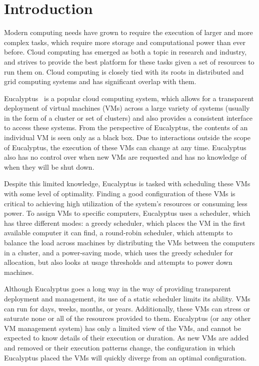\section{Introduction}
\label{sec:intro}

   Modern computing needs have grown to require the execution of larger and more complex tasks, which require more storage and computational power than ever before.  Cloud computing has emerged as both a topic in research and industry, and strives to provide the best platform for these tasks given a set of resources to run them on.  Cloud computing is closely tied with its roots in distributed and grid computing systems and has significant overlap with them.  

  Eucalyptus~\cite{Eucalyptus} is a popular cloud computing system, which allows for a transparent deployment of virtual machines (VMs) across a large variety of systems (usually in the form of a cluster or set of clusters) and also provides a consistent interface to access these systems.  From the perspective of Eucalyptus, the contents of an individual VM is seen only as a black box.  Due to interactions outside the scope of Eucalyptus, the execution of these VMs can change at any time.  Eucalyptus also has no control over when new VMs are requested and has no knowledge of when they will be shut down.

Despite this limited knowledge, Eucalyptus is tasked with scheduling these VMs with some level of optimality.  Finding a good configuration of these VMs is critical to achieving high utilization of the system's resources or consuming less power.  To assign VMs to specific computers, Eucalyptus uses a scheduler, which has three different modes: a greedy scheduler, which places the VM in the first available computer it can find, a round-robin scheduler, which attempts to balance the load across machines by distributing the VMs between the computers in a cluster, and a power-saving mode, which uses the greedy scheduler for allocation, but also looks at usage thresholds and attempts to power down machines.

  Although Eucalyptus goes a long way in the way of providing transparent deployment and management, its use of a static scheduler limits its ability.  VMs can run for days, weeks, months, or years.  Additionally, these VMs can stress or saturate none or all of the resources provided to them.  Eucalyptus (or any other VM management system) has only a limited view of the VMs, and cannot be expected to know details of their execution or duration.  As new VMs are added and removed or their execution patterns change, the configuration in which Eucalyptus placed the VMs will quickly diverge from an optimal configuration.

